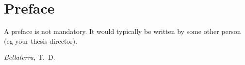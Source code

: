 \chapter*{Preface}
A preface is not mandatory. It would typically be written by some other person (eg your thesis director).

\lipsum[1-2]

\bigskip
 
\noindent\textit{Bellaterra, \@date}
\hfill T.~D.

